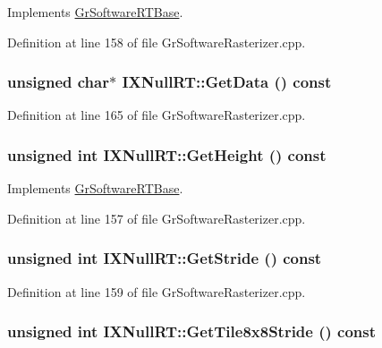 Implements \hyperlink{class_gr_software_r_t_base_24d6fc1742e612d9fa304e2264bd9dd8}{GrSoftwareRTBase}.

Definition at line 158 of file GrSoftwareRasterizer.cpp.\hypertarget{class_i_x_null_r_t_18bee9ebdc0d97a52ed54f67601e9ba4}{
\subsubsection[{GetData}]{\setlength{\rightskip}{0pt plus 5cm}unsigned char$\ast$ IXNullRT::GetData () const}}
\label{class_i_x_null_r_t_18bee9ebdc0d97a52ed54f67601e9ba4}




Definition at line 165 of file GrSoftwareRasterizer.cpp.\hypertarget{class_i_x_null_r_t_5b13ae270a175d81819b723ed179d509}{
\subsubsection[{GetHeight}]{\setlength{\rightskip}{0pt plus 5cm}unsigned int IXNullRT::GetHeight () const}}
\label{class_i_x_null_r_t_5b13ae270a175d81819b723ed179d509}




Implements \hyperlink{class_gr_software_r_t_base_28d12d92fea7b0a5891123fe7d5dfc74}{GrSoftwareRTBase}.

Definition at line 157 of file GrSoftwareRasterizer.cpp.\hypertarget{class_i_x_null_r_t_222102700f00521e11cf2ae89ce3b061}{
\subsubsection[{GetStride}]{\setlength{\rightskip}{0pt plus 5cm}unsigned int IXNullRT::GetStride () const}}
\label{class_i_x_null_r_t_222102700f00521e11cf2ae89ce3b061}




Definition at line 159 of file GrSoftwareRasterizer.cpp.\hypertarget{class_i_x_null_r_t_798d86cbd68ba16bfbc2fa9b8cdbde1c}{
\subsubsection[{GetTile8x8Stride}]{\setlength{\rightskip}{0pt plus 5cm}unsigned int IXNullRT::GetTile8x8Stride () const}}
\label{class_i_x_null_r_t_798d86cbd68ba16bfbc2fa9b8cdbde1c}




